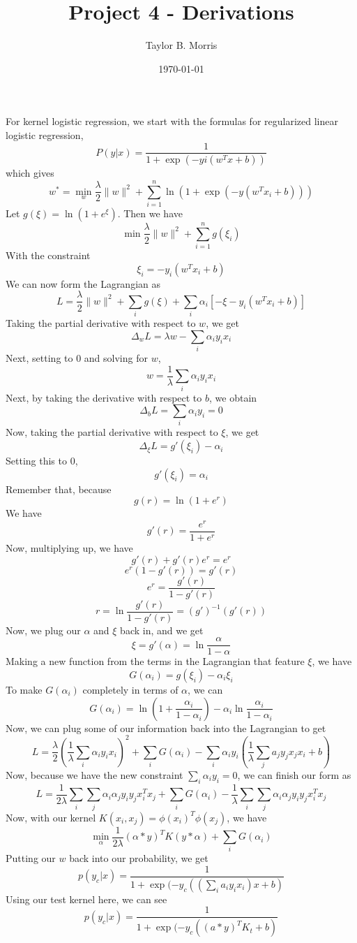 \documentclass{article}
\author{Taylor B. Morris}
\title{Project 4 - Derivations}
\date{\today}
\begin{document}
\maketitle

For kernel logistic regression, we start with the formulas for regularized linear logistic 
regression,
$$P(y|x) = \frac{1}{1+\exp(-yi(w^Tx+b))}$$ 
which gives 
$$w^* = \min_w \frac{\lambda}{2}\|w\|^2 + \sum_{i=1}^n \ln(1+\exp(-y(w^Tx_i+b)))$$
Let $g(\xi) = \ln(1+e^\xi)$. Then we have 
$$\min \frac{\lambda}{2}\|w\|^2 + \sum_{i=1}^n g(\xi_i)$$
With the constraint
$$\xi_i =  -y_i(w^Tx_i + b)$$
We can now form the Lagrangian as 
$$L = \frac{\lambda}{2}\|w\|^2 + \sum_ig(\xi)+\sum_i\alpha_i\left[-\xi-y_i(w^Tx_i+b)\right]$$
Taking the partial derivative with respect to $w$, we get
$$\Delta_wL = \lambda w - \sum_i\alpha_iy_ix_i $$
Next, setting to 0 and solving for $w$,
$$w = \frac{1}{\lambda}\sum_i \alpha_i y_i x_i$$
Next, by taking the derivative with respect to $b$, we obtain
$$\Delta_b L = \sum_i\alpha_iy_i = 0$$
Now, taking the partial derivative with respect to $\xi$, we get
$$\Delta_\xi L = g'(\xi_i)-\alpha_i$$
Setting this to 0, 
$$g'(\xi_i)=\alpha_i$$
Remember that, because
$$g(r) = \ln(1+e^r)$$
We have
$$g'(r) = \frac{e^r}{1+e^r}$$
Now, multiplying up, we have
$$g'(r)+g'(r)e^r = e^r$$
$$e^r (1-g'(r))=g'(r)$$
$$e^r=\frac{g'(r)}{1-g'(r)}$$
$$r = \ln \frac {g'(r)}{1-g'(r)}=(g')^{-1}(g'(r))$$
Now, we plug our $\alpha$ and $\xi$ back in, and we get
$$\xi = g'(\alpha) = \ln \frac{\alpha}{1-\alpha}$$
Making a new function from the terms in the Lagrangian that feature $\xi$, we have
$$G(\alpha_i) = g(\xi_i) - \alpha_i\xi_i$$
To make $G(\alpha_i)$ completely in terms of $\alpha$, we can
$$G(\alpha_i) = \ln(1+\frac{\alpha_i}{1-\alpha_i})-\alpha_i\ln\frac{\alpha_i}{1-\alpha_i}$$ 
Now, we can plug some of our information back into the Lagrangian to get 
$$L = \frac{\lambda}{2}(\frac{1}{\lambda}\sum_i\alpha_iy_ix_i)^2 + \sum_i G(\alpha_i) - \sum_i \alpha_iy_i(\frac{1}{\lambda}\sum_ja_jy_jx_jx_i + b)$$
Now, because we have the new constraint $\sum_i\alpha_iy_i=0$, we can finish our form as
$$L = \frac{1}{2\lambda}\sum_i\sum_j\alpha_i\alpha_jy_iy_jx_i^Tx_j + \sum_i G(\alpha_i) -\frac{1}{\lambda} \sum_i\sum_j \alpha_i\alpha_jy_iy_jx_i^Tx_j$$
Now, with our kernel $K(x_i,x_j)=\phi(x_i)^T\phi(x_j)$, we have
$$\min_\alpha \frac{1}{2\lambda}(\alpha*y)^TK(y*\alpha) + \sum_i G(\alpha_i)$$
Putting our $w$ back into our probability, we get
$$p(y_c|x)=\frac{1}{1+\exp(-y_c((\sum_ia_iy_ix_i)x+b)}$$
Using our test kernel here, we can see
$$p(y_c|x)=\frac{1}{1+\exp(-y_c((a*y)^TK_t + b)}$$
\end{document}
